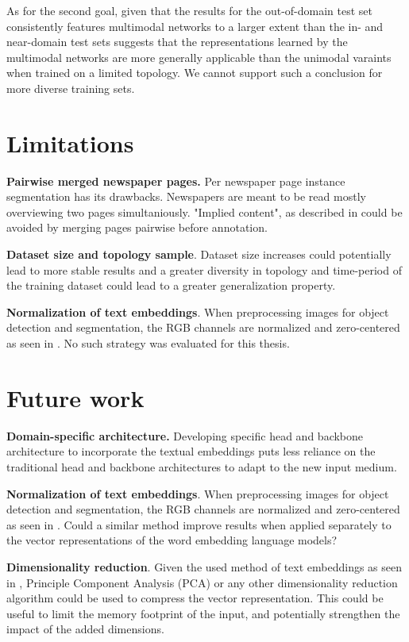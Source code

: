 \documentclass[oneside, english, bibtex]{kththesis}
\begin{document}
As for the second goal, given that the results for the out-of-domain test set consistently features multimodal networks to a larger extent than the in- and near-domain test sets suggests that the representations learned by the multimodal networks are more generally applicable than the unimodal varaints when trained on a limited topology. We cannot support such a conclusion for more diverse training sets.


\section{Limitations}

\textbf{Pairwise merged newspaper pages.} Per newspaper page instance segmentation has its drawbacks. Newspapers are meant to be read mostly overviewing two pages simultaniously. "Implied content", as described in  could be avoided by merging pages pairwise before annotation.


\textbf{Dataset size and topology sample}. Dataset size increases could potentially lead to more stable results and a greater diversity in topology and time-period of the training dataset could lead to a greater generalization property.


\textbf{Normalization of text embeddings}. When preprocessing images for object detection and segmentation, the RGB channels are normalized and zero-centered as seen in . No such strategy was evaluated for this thesis.

\section{Future work}

\textbf{Domain-specific architecture.} Developing specific head and backbone architecture to incorporate the textual embeddings puts less reliance on the traditional head and backbone architectures to adapt to the new input medium.

\textbf{Normalization of text embeddings}. When preprocessing images for object detection and segmentation, the RGB channels are normalized and zero-centered as seen in . Could a similar method improve results when applied separately to the vector representations of the word embedding language models?

\textbf{Dimensionality reduction}. Given the used method of text embeddings as seen in , Principle Component Analysis (PCA) or any other dimensionality reduction algorithm could be used to compress the vector representation. This could be useful to limit the memory footprint of the input, and potentially strengthen the impact of the added dimensions.
\end{document}

